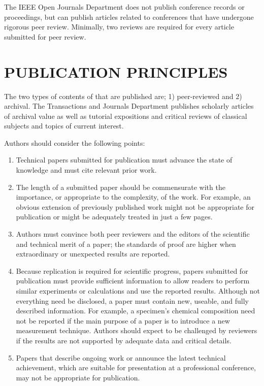 \documentclass{ieeeojpel}
\begin{document}
The IEEE Open Journals Department does not publish conference records or 
proceedings, but can publish articles related to conferences that have 
undergone rigorous peer review. Minimally, two reviews are required for 
every article submitted for peer review.

\section{PUBLICATION PRINCIPLES}
The two types of contents of that are published are; 1) peer-reviewed and 2) 
archival. The Transactions and Journals Department publishes scholarly 
articles of archival value as well as tutorial expositions and critical 
reviews of classical subjects and topics of current interest. 

Authors should consider the following points:

\begin{enumerate}
\item Technical papers submitted for publication must advance the state of knowledge and must cite relevant prior work. 
\item The length of a submitted paper should be commensurate with the importance, or appropriate to the complexity, of the work. For example, an obvious extension of previously published work might not be appropriate for publication or might be adequately treated in just a few pages.
\item Authors must convince both peer reviewers and the editors of the scientific and technical merit of a paper; the standards of proof are higher when extraordinary or unexpected results are reported. 
\item Because replication is required for scientific progress, papers submitted for publication must provide sufficient information to allow readers to perform similar experiments or calculations and use the reported results. Although not everything need be disclosed, a paper must contain new, useable, and fully described information. For example, a specimen's chemical composition need not be reported if the main purpose of a paper is to introduce a new measurement technique. Authors should expect to be challenged by reviewers if the results are not supported by adequate data and critical details.
\item Papers that describe ongoing work or announce the latest technical achievement, which are suitable for presentation at a professional conference, may not be appropriate for publication.
\end{enumerate}
\end{document}
